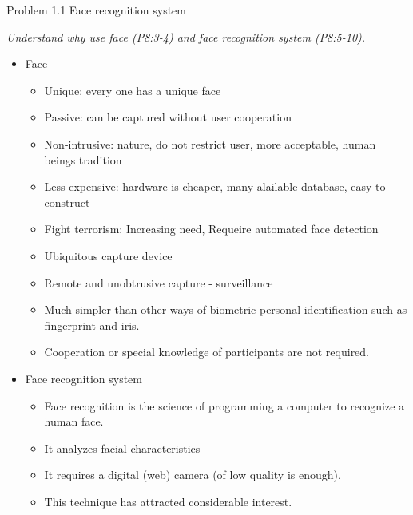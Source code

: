 \documentclass[
        ]{beamer}
\begin{document}
    		\begin{frame}[t]{Problem 1.1 Face recognition system}    		
    			\begin{overprint}
    			\emph{Understand why use face (P8:3-4) and face recognition system (P8:5-10).}
    			\onslide<2> 
    			\onslide<3> 
    			\onslide<4> 
    			\onslide<5> 
    			\onslide<6> 
    			\onslide<7> 
    			\onslide<8> 
    			\onslide<9> 
    			\onslide<10>
    				\begin{itemize}
    				\item Face 				
    					\begin{itemize}
    					\item Unique: every one has a unique face
    					\item Passive: can be captured without user cooperation
    					\item Non-intrusive: nature, do not restrict user, more acceptable, human beings tradition
    					\item Less expensive: hardware is cheaper, many alailable database, easy to construct
    					\item Fight terrorism: Increasing need, Requeire automated face detection
    					\item Ubiquitous capture device
    					\item Remote and unobtrusive capture - surveillance
    					\item Much simpler than other ways of biometric personal identification such as fingerprint and iris.
    					\item Cooperation or special knowledge of participants are not required.
    					\end{itemize}		
    				\end{itemize}
    				\begin{itemize}
    				\item Face recognition system				
    					\begin{itemize}
    					\item Face recognition is the science of programming a
computer to recognize a human face.
    					\item It analyzes facial characteristics
    					\item It requires a digital (web) camera (of low quality is enough).
    					\item This technique has attracted considerable interest.

\end{itemize}
\end{itemize}
\end{overprint}
\end{frame}
\end{document}
